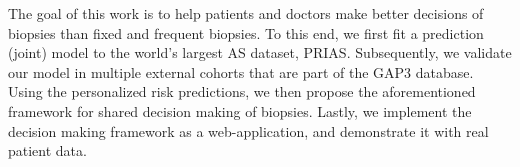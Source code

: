 The goal of this work is to help patients and doctors make better decisions of biopsies than fixed and frequent biopsies. To this end, we first fit a prediction (joint) model to the world's largest AS dataset, PRIAS. Subsequently, we validate our model in multiple external cohorts that are part of the GAP3 database. Using the personalized risk predictions, we then propose the aforementioned framework for shared decision making of biopsies. Lastly, we implement the decision making framework as a web-application, and demonstrate it with real patient data.